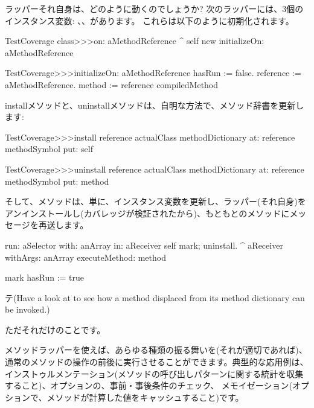 \documentclass[a4paper,10pt,twoside]{book}
\begin{document}
ラッパーそれ自身は、どのように動くのでしょうか?
次のラッパーには、3個のインスタンス変数: 、、があります。
これらは以下のように初期化されます。
\begin{code}{}
TestCoverage class>>>on: aMethodReference
	^ self new initializeOn: aMethodReference

TestCoverage>>>initializeOn: aMethodReference
	hasRun := false.
	reference := aMethodReference.
	method := reference compiledMethod
\end{code}

installメソッドと、uninstallメソッドは、自明な方法で、メソッド辞書を更新します:
\begin{code}{}
TestCoverage>>>install
	reference actualClass methodDictionary
		at: reference methodSymbol
		put: self

TestCoverage>>>uninstall
	reference actualClass methodDictionary
		at: reference methodSymbol
		put: method
\end{code}
\noindent
そして、メソッドは、単に、インスタンス変数を更新し、ラッパー(それ自身)をアンインストールし(カバレッジが検証されたから)、もともとのメソッドにメッセージを再送します。%
\begin{code}{}
run: aSelector with: anArray in: aReceiver
	self mark; uninstall.
	^ aReceiver withArgs: anArray executeMethod: method

mark
	hasRun := true
\end{code}
テ(Have a look at  to see how a method displaced from its method dictionary can be invoked.)

ただそれだけのことです。

メソッドラッパーを使えば、あらゆる種類の振る舞いを(それが適切であれば)、通常のメソッドの操作の前後に実行させることができます。典型的な応用例は、インストゥルメンテーション(メソッドの呼び出しパターンに関する統計を収集すること)、オプションの、事前・事後条件のチェック、 メモイゼーション(オプションで、メソッドが計算した値をキャッシュすること)です。
\end{document}
